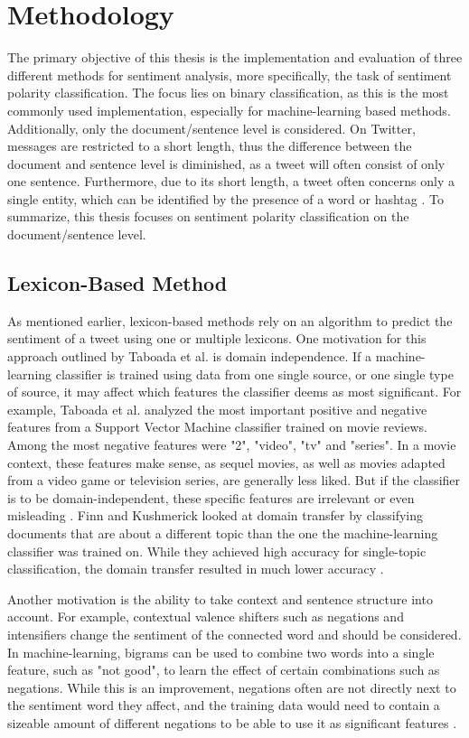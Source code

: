 \chapter{Methodology}
\label{cha:Chapter4_Methodology}
The primary objective of this thesis is the implementation and evaluation of three different methods for sentiment analysis, more specifically, the task of sentiment polarity classification. The focus lies on binary classification, as this is the most commonly used implementation, especially for machine-learning based methods. Additionally, only the document/sentence level is considered. On Twitter, messages are restricted to a short length, thus the difference between the document and sentence level is diminished, as a tweet will often consist of only one sentence. Furthermore, due to its short length, a tweet often concerns only a single entity, which can be identified by the presence of a word or hashtag \cite{DBLP:journals/csur/GiachanouC16}. To summarize, this thesis focuses on sentiment polarity classification on the document/sentence level.

\section{Lexicon-Based Method}
As mentioned earlier, lexicon-based methods rely on an algorithm to predict the sentiment of a tweet using one or multiple lexicons. One motivation for this approach outlined by Taboada et al. is domain independence. If a machine-learning classifier is trained using data from one single source, or one single type of source, it may affect which features the classifier deems as most significant. For example, Taboada et al. analyzed the most important positive and negative features from a Support Vector Machine classifier trained on movie reviews. Among the most negative features were "2", "video", "tv" and "series". In a movie context, these features make sense, as sequel movies, as well as movies adapted from a video game or television series, are generally less liked. But if the classifier is to be domain-independent, these specific features are irrelevant or even misleading \cite{taboada}. Finn and Kushmerick looked at domain transfer by classifying documents that are about a different topic than the one the machine-learning classifier was trained on. While they achieved high accuracy for single-topic classification, the domain transfer resulted in much lower accuracy \cite{Finn03learningto}.

Another motivation is the ability to take context and sentence structure into account. For example, contextual valence shifters such as negations and intensifiers change the sentiment of the connected word and should be considered. In machine-learning, bigrams can be used to combine two words into a single feature, such as "not good", to learn the effect of certain combinations such as negations. While this is an improvement, negations often are not directly next to the sentiment word they affect, and the training data would need to contain a sizeable amount of different negations to be able to use it as significant features \cite{taboada}.

